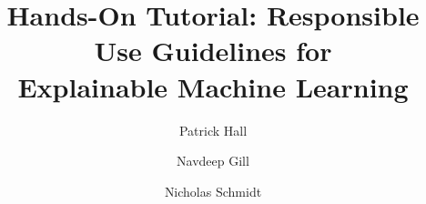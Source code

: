 \documentclass[sigconf]{acmart}
\begin{document}
\title[Responsible XAI]{\huge{Hands-On Tutorial: Responsible Use Guidelines for\\ Explainable Machine Learning}}


\author{Patrick Hall}

\author{Navdeep Gill}

\author{Nicholas Schmidt }

\renewcommand{\shortauthors}{Hall, Gill, \& Schmidt}

%

%
%



		
		
\end{document}
